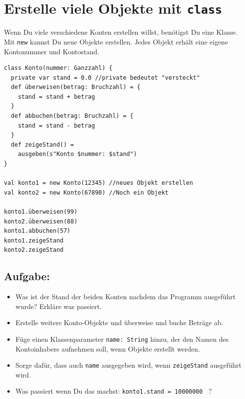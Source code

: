 \chapter{Erstelle viele Objekte mit \lstinline{class}}
\begin{multicols}{2}
Wenn Du viele verschiedene Konten erstellen willst, benötigst Du eine Klasse. Mit \lstinline{new} kannst Du neue Objekte erstellen. Jedes Objekt erhält eine eigene Kontonummer und Kontostand.

\begin{lstlisting}[basicstyle={\ttfamily\fontsize{13}{16}\selectfont},numbers=none]
class Konto(nummer: Ganzzahl) {
  private var stand = 0.0 //private bedeutet "versteckt"  
  def überweisen(betrag: Bruchzahl) = {
    stand = stand + betrag 
  }
  def abbuchen(betrag: Bruchzahl) = { 
    stand = stand - betrag 
  }
  def zeigeStand() = 
    ausgeben(s"Konto $nummer: $stand")
}

val konto1 = new Konto(12345) //neues Objekt erstellen
val konto2 = new Konto(67890) //Noch ein Objekt

konto1.überweisen(99)
konto2.überweisen(88)
konto1.abbuchen(57)
konto1.zeigeStand
konto2.zeigeStand
\end{lstlisting}
        


\columnbreak


\section*{\color{BrickRed}Aufgabe:}


\begin{itemize}

\item {Was ist der Stand der beiden Konten nachdem das Programm ausgeführt wurde? Erkläre was passiert.}
\item {Erstelle weitere Konto-Objekte und überweise und buche Beträge ab.}
\item {Füge einen Klassenparameter \lstinline{name: String} hinzu, der den Namen des Kontoinhabers aufnehmen soll, wenn Objekte erstellt werden.}
\item {Sorge dafür, dass auch \lstinline{name} ausgegeben wird, wenn \lstinline{zeigeStand} ausgeführt wird.}
\item {Was passiert wenn Du das machst: \lstinline{konto1.stand = 10000000 } ?}

\end{itemize}


\end{multicols}

